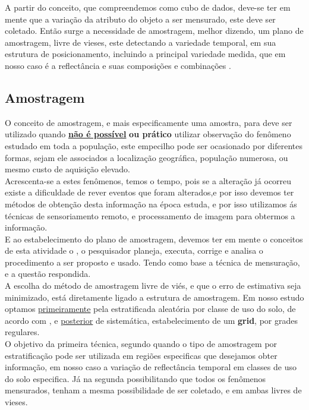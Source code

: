 	\hspace*{1.25 cm} A partir do conceito, que compreendemos como cubo de dados, deve-se ter em mente que a variação da atributo do objeto a ser mensurado, este deve ser coletado. Então  surge a necessidade de amostragem, melhor dizendo, um plano de amostragem, livre de vieses, este detectando a variedade temporal, em sua estrutura de posicionamento, incluindo a principal variedade medida, que em nosso caso é a reflectância e suas composições e combinações .

	\subsection{Amostragem}
	\hspace*{1.25 cm} O conceito de amostragem, e mais especificamente uma amostra, para  \cite[p.~281]{Krishnaswamy} deve ser utilizado quando \textbf{\underline{não é possível}} \textbf{ou prático} utilizar observação do fenômeno estudado em toda a população, este empecilho pode ser ocasionado por diferentes formas, sejam ele associados a localização geográfica, população numerosa, ou mesmo custo de aquisição elevado.\\
	\hspace*{1.25 cm}  Acrescenta-se a estes fenômenos, temos o tempo, pois se a alteração já ocorreu existe a dificuldade de rever eventos que foram alterados,e por isso devemos ter métodos de obtenção desta informação na época estuda, e por isso utilizamos ás técnicas de sensoriamento remoto, e processamento de imagem  para obtermos a informação.\\
	\hspace*{1.25 cm} E ao estabelecimento do plano de amostragem, devemos ter em mente o conceitos de esta atividade o  \cite[p.2]{Bolfarine1},  o pesquisador planeja, executa, corrige e analisa o procedimento a ser proposto e usado. Tendo como base a técnica de mensuração, e a questão respondida.\\
	\hspace*{1.25 cm} A escolha do método de amostragem livre de viés, e que o erro de estimativa seja minimizado, está diretamente ligado a estrutura de amostragem.  Em nosso estudo optamos \underline{primeiramente} pela estratificada aleatória por classe de uso do solo, de acordo com \cite[p.191]{Ariza}, e  \underline{posterior}  de  sistemática, estabelecimento de um \textbf{grid}, por grades regulares.\\
	\hspace*{1.25 cm}  O objetivo da primeira técnica, segundo  \cite[p.22]{Lohr} quando o tipo de amostragem por estratificação pode ser utilizada em regiões especificas que desejamos obter informação, em nosso caso a variação de reflectância temporal em classes de uso do solo especifica. Já na segunda  possibilitando que todos os fenômenos mensurados, tenham a mesma possibilidade de ser coletado, e em ambas livres de vieses.\\
